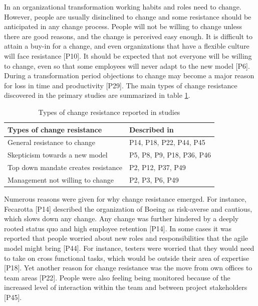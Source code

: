 \documentclass[preprint,authoryear,12pt]{elsarticle}
\begin{document}
In an organizational transformation working habits and roles need to change.
However, people are usually disinclined to change and some resistance should be
anticipated in any change process. People will not be willing to change unless
there are good reasons, and the change is perceived easy enough. It is difficult
to attain a buy-in for a change, and even organizations that have a flexible
culture will face resistance [P10]. It should be expected that not everyone will
be willing to change, even so that some employees will never adapt to the new
model [P6]. During a transformation period objections to change may become a
major reason for loss in time and productivity [P29]. The main types of change
resistance discovered in the primary studies are summarized in table
\ref{table:challenges_changeresistance}.

\begin{table}[b]
    \centering
    \begin{tabular}{ l l }
        \toprule
        Types of change resistance           &  Described in  \\
        \midrule
        General resistance to change         &  P14, P18, P22, P44, P45   \\
        Skepticism towards a new model       &  P5, P8, P9, P18, P36, P46 \\
        Top down mandate creates resistance  &  P2, P12, P37, P49 \\
        Management not willing to change     &  P2, P3, P6, P49 \\
        \bottomrule
    \end{tabular}
    \caption{Types of change resistance reported in studies}
    \label{table:challenges_changeresistance}
\end{table}

Numerous reasons were given for why change resistance emerged. For
instance, Fecarotta [P14] described the organization of Boeing as risk-averse
and cautious, which slows down any change. Any change was further hindered by a
deeply rooted status quo and high employee retention [P14]. In some cases it was
reported that people worried about new roles and responsibilities that the agile
model might bring [P44]. For instance, testers were worried that they would need
to take on cross functional tasks, which would be outside their area of
expertise [P18]. Yet another reason for change resistance was the move from own
offices to team areas [P22]. People were also feeling being monitored because of
the increased level of interaction within the team and between project
stakeholders [P45].
\end{document}
